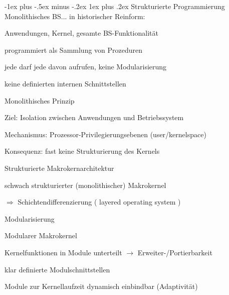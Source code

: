 \documentclass[a4paper]{article}
\makeatletter
\renewcommand{\subsubsection}{\@startsection{subsubsection}{3}{0mm}%
 {-1ex plus -.5ex minus -.2ex}%
 {1ex plus .2ex}%
 {\normalfont\small\bfseries}}
\makeatother
\begin{document}
\begin{multicols}{3}
    \subsubsection{Strukturierte Programmierung}
    Monolithisches BS... in historischer Reinform:
    \begin{itemize*}
        \item Anwendungen, Kernel, gesamte BS-Funktionalität
        \item programmiert als Sammlung von Prozeduren
        \item jede darf jede davon aufrufen, keine Modularisierung
        \item keine definierten internen Schnittstellen
    \end{itemize*}

    Monolithisches Prinzip
    \begin{itemize*}
        \item Ziel: Isolation zwischen Anwendungen und Betriebssystem
        \item Mechanismus: Prozessor-Privilegierungsebenen (user/kernelspace)
        \item Konsequenz: fast keine Strukturierung des Kernels
    \end{itemize*}

    Strukturierte Makrokernarchitektur
    \begin{itemize*}
        \item schwach strukturierter (monolithischer) Makrokernel
        \item[$\Rightarrow$] Schichtendifferenzierung ( layered operating system )
        \item Modularisierung
    \end{itemize*}
    Modularer Makrokernel
    \begin{itemize*}
        \item Kernelfunktionen in Module unterteilt $\rightarrow$ Erweiter-/Portierbarkeit
        \item klar definierte Modulschnittstellen
        \item Module zur Kernellaufzeit dynamisch einbindbar (Adaptivität)
    \end{itemize*}


\end{multicols}
\end{document}

